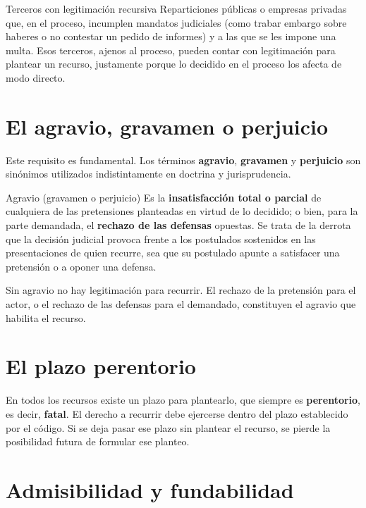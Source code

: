 \documentclass[12pt,oneside]{book}
\begin{document}
\begin{example}{Terceros con legitimación recursiva}
Reparticiones públicas o empresas privadas que, en el proceso, incumplen mandatos judiciales (como trabar embargo sobre haberes o no contestar un pedido de informes) y a las que se les impone una multa. Esos terceros, ajenos al proceso, pueden contar con legitimación para plantear un recurso, justamente porque lo decidido en el proceso los afecta de modo directo.
\end{example}

\section{El agravio, gravamen o perjuicio}

Este requisito es fundamental. Los términos \textbf{agravio}, \textbf{gravamen} y \textbf{perjuicio} son sinónimos utilizados indistintamente en doctrina y jurisprudencia.

\begin{definition}{Agravio (gravamen o perjuicio)}
Es la \textbf{insatisfacción total o parcial} de cualquiera de las pretensiones planteadas en virtud de lo decidido; o bien, para la parte demandada, el \textbf{rechazo de las defensas} opuestas. Se trata de la derrota que la decisión judicial provoca frente a los postulados sostenidos en las presentaciones de quien recurre, sea que su postulado apunte a satisfacer una pretensión o a oponer una defensa.
\end{definition}

Sin agravio no hay legitimación para recurrir. El rechazo de la pretensión para el actor, o el rechazo de las defensas para el demandado, constituyen el agravio que habilita el recurso.

\section{El plazo perentorio}

En todos los recursos existe un plazo para plantearlo, que siempre es \textbf{perentorio}, es decir, \textbf{fatal}. El derecho a recurrir debe ejercerse dentro del plazo establecido por el código. Si se deja pasar ese plazo sin plantear el recurso, se pierde la posibilidad futura de formular ese planteo.

\section{Admisibilidad y fundabilidad}
\end{document}
